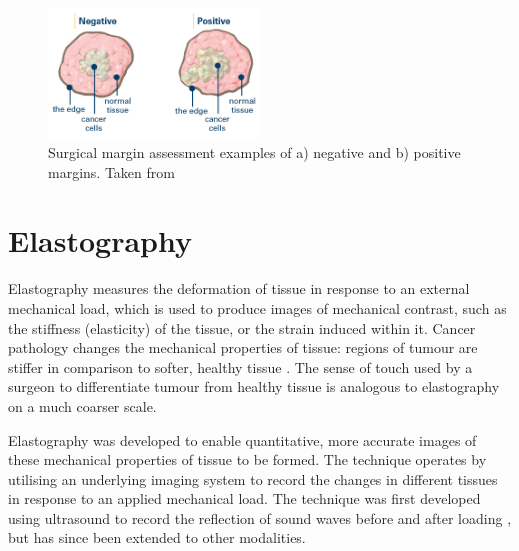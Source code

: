 \begin{figure}[t]
	\centering
    \includegraphics[width=0.5\textwidth]{bground_figs/margins.png}
    \caption{Surgical margin assessment examples of a) negative and b) positive margins. Taken from \cite{breastcancer.org_surgical_2017}}
	    \label{margins}
\end{figure}

\section{Elastography}\label{elastography}
Elastography measures the deformation of tissue in response to an external mechanical load, which is used to produce images of mechanical contrast, such as the stiffness (elasticity) of the tissue, or the strain induced within it. Cancer pathology changes the mechanical properties of tissue: regions of tumour are stiffer in comparison to softer, healthy tissue \cite{fung_biomechanics_1981}. The sense of touch used by a surgeon to differentiate tumour from healthy tissue is analogous to elastography on a much coarser scale. 

Elastography was developed to enable quantitative, more accurate images of these mechanical properties of tissue to be formed. The technique operates by utilising an underlying imaging system to record the changes in different tissues in response to an applied mechanical load. The technique was first developed using ultrasound to record the reflection of sound waves before and after loading \cite{ophir_elastography:_1991}, but has since been extended to other modalities. 


